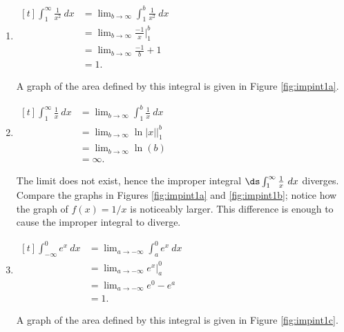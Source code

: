 {\begin{enumerate}
\item		\hfill$\begin{aligned}[t] \int_1^\infty \frac{1}{x^2}\ dx &= \lim_{b\to\infty} \int_1^b\frac1{x^2}\ dx \\ 
 &= \lim_{b\to\infty} \frac{-1}{x}\Big|_1^b \\
 &= \lim_{b\to\infty} \frac{-1}{b} + 1\\
 &= 1.\end{aligned}$\hfill\null

A graph of the area defined by this integral is given in Figure \ref{fig:impint1a}.
 
 
\item		\hfill$\begin{aligned}[t]%
			\int_1^\infty \frac1x\ dx & = \lim_{b\to\infty}\int_1^b\frac1x\ dx \\
						&= \lim_{b\to\infty} \ln |x|\Big|_1^b \\
						&= \lim_{b\to\infty} \ln (b)\\
						&= \infty.
	\end{aligned}$\hfill\null
	
The limit does not exist, hence the improper integral $\ds\int_1^\infty\frac1x\ dx$ diverges. Compare the graphs in Figures \ref{fig:impint1a} and \ref{fig:impint1b}; notice how the graph of $f(x) = 1/x$ is noticeably larger. This difference is enough to cause the improper integral to diverge.


\item		\hfill$\begin{aligned}[t]%
			\int_{-\infty}^0 e^x \ dx &= \lim_{a\to-\infty} \int_a^0e^x\ dx \\
					&=  \lim_{a\to-\infty} e^x\Big|_a^0 \\
					&= \lim_{a\to-\infty} e^0-e^a \\
					&= 1.
		\end{aligned}$\hfill\null
		
		A graph of the area defined by this integral is given in Figure \ref{fig:impint1c}.
		


\end{enumerate}}
